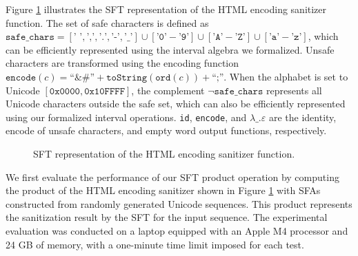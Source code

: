 Figure \ref{fig:html-sanitizer-sft} illustrates the SFT representation of the HTML encoding sanitizer function.
 The set of safe characters is defined as $\texttt{safe\_chars} = [\texttt{' '}, \texttt{','}, \texttt{'.'}, \texttt{'-'}, \texttt{'\_'}] \cup [\texttt{'0'}-\texttt{'9'}] \cup [\texttt{'A'}-\texttt{'Z'}] \cup [\texttt{'a'}-\texttt{'z'}]$, which can be efficiently represented using the interval algebra we formalized. Unsafe characters are transformed using the encoding function $\texttt{encode}(c) = \texttt{``\&\#''} + \texttt{toString}(\texttt{ord}(c)) + \texttt{``;''}$. When the alphabet is set to Unicode $[\mathtt{0x0000}, \mathtt{0x10FFFF}]$, the complement $\neg\texttt{safe\_chars}$ represents all Unicode characters outside the safe set, which can also be efficiently represented using our formalized interval operations. \texttt{id}, \texttt{encode}, and $\lambda \_.\varepsilon$ are the identity, encode of unsafe characters, and empty word output functions, respectively.
\begin{figure}[htbp]
\centering
{}
\caption{SFT representation of the HTML encoding sanitizer function.}
\label{fig:html-sanitizer-sft}
\end{figure}

We first evaluate the performance of our SFT product operation by computing the product of the HTML encoding sanitizer shown in Figure \ref{fig:html-sanitizer-sft} with SFAs constructed from randomly generated Unicode sequences. This product represents the sanitization result by the SFT for the input sequence. The experimental evaluation was conducted on a laptop equipped with an Apple M4 processor and 24 GB of memory, with a one-minute time limit imposed for each test.



